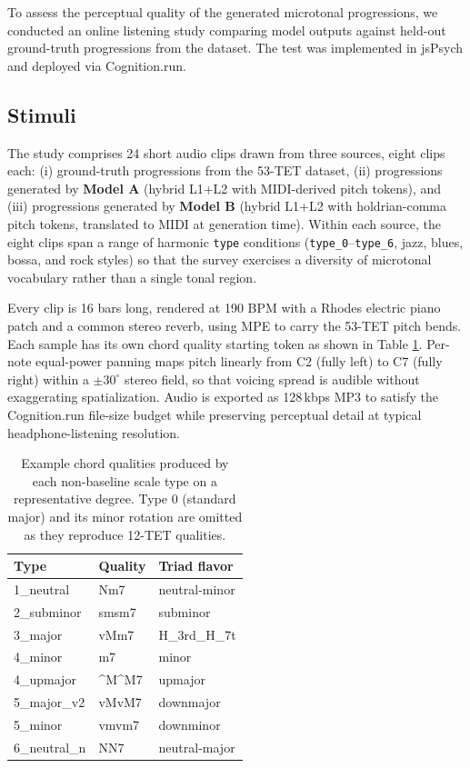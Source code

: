 \documentclass{aimc2026}
\begin{document}
To assess the perceptual quality of the generated microtonal progressions, we conducted an online listening study comparing model outputs against held-out ground-truth progressions from the dataset. The test was implemented in jsPsych \citep{de2023jspsych} and deployed via Cognition.run.


\subsection{Stimuli}

The study comprises 24 short audio clips drawn from three sources, eight clips each: (i) ground-truth progressions from the 53-TET dataset, (ii) progressions generated by \textbf{Model A} (hybrid L1+L2 with MIDI-derived pitch tokens), and (iii) progressions generated by \textbf{Model B} (hybrid L1+L2 with holdrian-comma pitch tokens, translated to MIDI at generation time). Within each source, the eight clips span a range of harmonic \texttt{type} conditions (\texttt{type\_0}--\texttt{type\_6}, jazz, blues, bossa, and rock styles) so that the survey exercises a diversity of microtonal vocabulary rather than a single tonal region.

Every clip is 16 bars long, rendered at 190 BPM with a Rhodes electric piano patch and a common stereo reverb, using MPE to carry the 53-TET pitch bends. Each sample has its own chord quality starting token as shown in Table \ref{tab:type_qualities}. Per-note equal-power panning maps pitch linearly from C2 (fully left) to C7 (fully right) within a $\pm 30^{\circ}$ stereo field, so that voicing spread is audible without exaggerating spatialization. Audio is exported as 128\,kbps MP3 to satisfy the Cognition.run file-size budget while preserving perceptual detail at typical headphone-listening resolution.

\begin{table}[hbt!]
  \caption{Example chord qualities produced by each non-baseline scale type on a representative degree. Type 0 (standard major) and its minor rotation are omitted as they reproduce 12-TET qualities.}
  \label{tab:type_qualities}
  \centering
  \small
  \begin{tabular}{@{}lll@{}}
    \toprule
    Type & Quality & Triad flavor \\
    \midrule
    1\_neutral     & Nm7   & neutral-minor \\
    2\_subminor    & smsm7 & subminor \\
    3\_major       & vMm7  & H\_3rd\_H\_7t \\
    4\_minor       & m7    & minor \\
    4\_upmajor     & \^{}M\^{}M7 & upmajor \\
    5\_major\_v2   & vMvM7 & downmajor \\
    5\_minor       & vmvm7 & downminor \\
    6\_neutral\_n  & NN7   & neutral-major \\
    \bottomrule
  \end{tabular}
\end{table}
\end{document}
